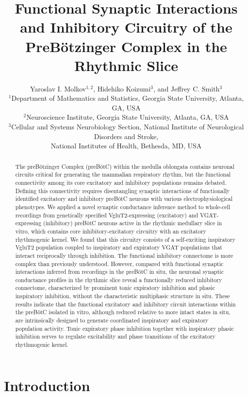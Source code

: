\documentclass[
]{article}
\title{Functional Synaptic Interactions and Inhibitory Circuitry of the PreBötzinger Complex in the Rhythmic Slice}
\author{Yaroslav I. Molkov$^{1,2}$, Hidehiko Koizumi$^{3}$, and Jeffrey C. Smith$^{3}$ \\
\small $^{1}$Department of Mathematics and Statistics, Georgia State University, Atlanta, GA, USA \\
\small $^{2}$Neuroscience Institute, Georgia State University, Atlanta, GA, USA \\
\small $^{3}$Cellular and Systems Neurobiology Section, National Institute of Neurological Disorders and Stroke, \\
\small National Institutes of Health, Bethesda, MD, USA}
\date{}
\begin{document}
\maketitle

\begin{abstract}

The preBötzinger Complex (preBötC) within the medulla oblongata contains neuronal circuits critical for generating the mammalian respiratory rhythm, but the functional connectivity among its core excitatory and inhibitory populations remains debated. Defining this connectivity requires disentangling synaptic interactions of functionally identified excitatory and inhibitory preBötC neurons with various electrophysiological phenotypes. We applied a novel synaptic conductance inference method to whole-cell recordings from genetically specified VgluT2-expressing (excitatory) and VGAT-expressing (inhibitory) preBötC neurons active in the rhythmic medullary slice in vitro, which contains core inhibitory-excitatory circuitry with an excitatory rhythmogenic kernel. We found that this circuitry consists of a self-exciting inspiratory VgluT2 population coupled to inspiratory and expiratory VGAT populations that interact reciprocally through inhibition. The functional inhibitory connectome is more complex than previously understood. However, compared with functional synaptic interactions inferred from recordings in the preBötC in situ, the neuronal synaptic conductance profiles in the rhythmic slice reveal a functionally reduced inhibitory connectome, characterized by prominent tonic expiratory inhibition and phasic inspiratory inhibition, without the characteristic multiphasic structure in situ. These results indicate that the functional excitatory and inhibitory circuit interactions within the preBötC isolated in vitro, although reduced relative to more intact states in situ, are intrinsically designed to generate coordinated inspiratory and expiratory population activity. Tonic expiratory phase inhibition together with inspiratory phasic inhibition serves to regulate excitability and phase transitions of the excitatory rhythmogenic kernel.

\end{abstract}

\section{Introduction}
\end{document}
